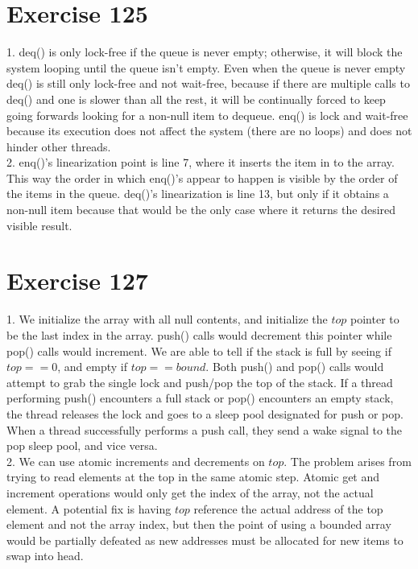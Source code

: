 \documentclass{article}
\begin{document}
\begin{adjustwidth}{-2cm}{-2cm}
\section{Exercise 125}
1. deq() is only lock-free if the queue is never empty; otherwise, it will block the system looping until the queue isn't empty. Even when the queue is never empty deq() is still only lock-free and not wait-free, because if there are multiple calls to deq() and one is slower than all the rest, it will be continually forced to keep going forwards looking for a non-null item to dequeue. enq() is lock and wait-free because its execution does not affect the system (there are no loops) and does not hinder other threads.\\
2. enq()'s linearization point is line 7, where it inserts the item in to the array. This way the order in which enq()'s appear to happen is visible by the order of the items in the queue. deq()'s linearization is line 13, but only if it obtains a non-null item because that would be the only case where it returns the desired visible result.
\section{Exercise 127}
1. We initialize the array with all null contents, and initialize the $top$ pointer to be the last index in the array. push() calls would decrement this pointer while pop() calls would increment. We are able to tell if the stack is full by seeing if $top == 0$, and empty if $top == bound$. Both push() and pop() calls would attempt to grab the single lock and push/pop the top of the stack. If a thread performing push() encounters a full stack or pop() encounters an empty stack, the thread releases the lock and goes to a sleep pool designated for push or pop. When a thread successfully performs a push call, they send a wake signal to the pop sleep pool, and vice versa.\\
2. We can use atomic increments and decrements on $top$. The problem arises from trying to read elements at the top in the same atomic step. Atomic get and increment operations would only get the index of the array, not the actual element. A potential fix is having $top$ reference the actual address of the top element and not the array index, but then the point of using a bounded array would be partially defeated as new addresses must be allocated for new items to swap into head.

\end{adjustwidth}
\end{document}
